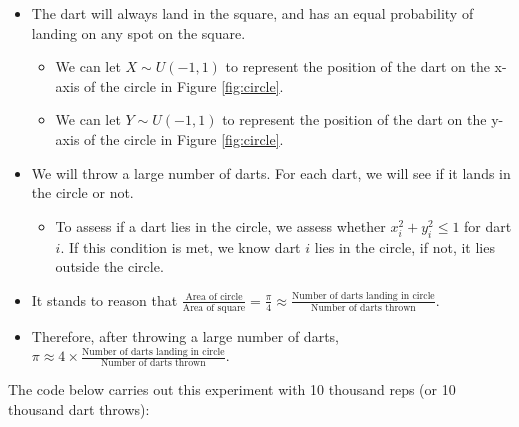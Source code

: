 \documentclass[
]{book}
\providecommand{\tightlist}{%
  \setlength{\itemsep}{0pt}\setlength{\parskip}{0pt}}
\begin{document}
\begin{itemize}
\tightlist
\item
  The dart will always land in the square, and has an equal probability of landing on any spot on the square.

  \begin{itemize}
  \tightlist
  \item
    We can let \(X \sim U(-1,1)\) to represent the position of the dart on the x-axis of the circle in Figure \ref{fig:circle}.
  \item
    We can let \(Y \sim U(-1,1)\) to represent the position of the dart on the y-axis of the circle in Figure \ref{fig:circle}.
  \end{itemize}
\item
  We will throw a large number of darts. For each dart, we will see if it lands in the circle or not.

  \begin{itemize}
  \tightlist
  \item
    To assess if a dart lies in the circle, we assess whether \(x_i^2 + y_i^2 \leq 1\) for dart \(i\). If this condition is met, we know dart \(i\) lies in the circle, if not, it lies outside the circle.
  \end{itemize}
\item
  It stands to reason that \(\frac{\text{Area of circle}}{\text{Area of square}} = \frac{\pi}{4} \approx \frac{\text{Number of darts landing in circle}}{\text{Number of darts thrown}}\).
\item
  Therefore, after throwing a large number of darts, \(\pi \approx 4 \times \frac{\text{Number of darts landing in circle}}{\text{Number of darts thrown}}.\)
\end{itemize}

The code below carries out this experiment with 10 thousand reps (or 10 thousand dart throws):
\end{document}
